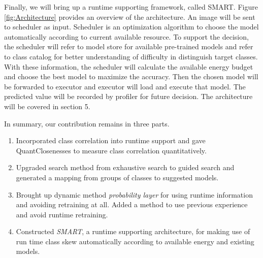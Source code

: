 \documentclass[conference]{IEEEtran}
\begin{document}
\begin{spacing}{0.9}
Finally, we will bring up a runtime supporting framework, called SMART. Figure \ref{fig:Architecture} provides an overview of the architecture. An image will be sent to scheduler as input. Scheduler is an optimization algorithm to choose the model automatically according to current available resource. To support the decision, the scheduler will refer to model store for available pre-trained models and refer to class catalog for better understanding of difficulty in distinguish target classes. With these information, the scheduler will calculate the available energy budget and choose the best model to maximize the accuracy. Then the chosen model will be forwarded to executor and executor will load and execute that model. The predicted value will be recorded by profiler for future decision. The architecture will be covered in section 5.

In summary, our contribution remains in three parts.

\begin{enumerate}
  \item Incorporated class correlation into runtime support and gave QuantClosenesses to measure class correlation quantitatively.
  \item Upgraded search method from exhaustive search to guided search and generated a mapping from groups of classes to suggested models.
  \item Brought up dynamic method \textit{probability layer} for using runtime information and avoiding retraining at all. Added a method to use previous experience and avoid runtime retraining.
  \item  Constructed \textit{SMART}, a runtime supporting architecture, for making use of run time class skew automatically according to available energy and existing models.
\end{enumerate}




\end{spacing}
\end{document}

